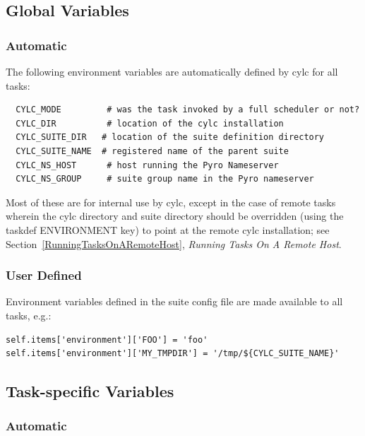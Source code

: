 \documentclass[11pt,a4paper]{article}
\begin{document}
\subsection{Global Variables}
\lstset{language=bash}

\subsubsection{Automatic}
The following environment variables are automatically defined by cylc
for all tasks:

\begin{lstlisting}
  CYLC_MODE         # was the task invoked by a full scheduler or not?
  CYLC_DIR          # location of the cylc installation
  CYLC_SUITE_DIR   # location of the suite definition directory
  CYLC_SUITE_NAME  # registered name of the parent suite 
  CYLC_NS_HOST      # host running the Pyro Nameserver
  CYLC_NS_GROUP     # suite group name in the Pyro nameserver
\end{lstlisting}

Most of these are for internal use by cylc, except in the case of remote
tasks wherein the cylc directory and suite directory should be
overridden (using the taskdef ENVIRONMENT key) to point at the remote
cylc installation; see Section~\ref{RunningTasksOnARemoteHost}, {\em
Running Tasks On A Remote Host}. 

\subsubsection{User Defined}
\label{SuiteWideVariables}

Environment variables defined in the suite config file are made
available to all tasks, e.g.: 

\lstset{language=Python}

\begin{lstlisting}
self.items['environment']['FOO'] = 'foo'
self.items['environment']['MY_TMPDIR'] = '/tmp/${CYLC_SUITE_NAME}'
\end{lstlisting}


\subsection{Task-specific Variables}
\label{TaskSpecificVariables}
\lstset{language=bash}

\subsubsection{Automatic}
\end{document}
